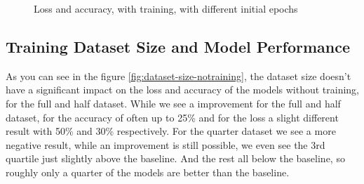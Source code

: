\begin{figure}
\begin{subfigure}{0.5\textwidth}
    \end{subfigure}
    \caption{Loss and accuracy, with training, with different initial epochs}
    \label{fig:initial-epochs-training}
\end{figure}
\subsection{Training Dataset Size and Model Performance}\label{subsec:training-dataset-size-and-model-performance}
As you can see in the figure \ref{fig:dataset-size-notraining}, the dataset size doesn't have a significant impact on the loss and accuracy of the models without training, for the full and half dataset.
While we see a improvement for the full and half dataset, for the accuracy of often up to 25\% and for the loss a slight different result with 50\% and 30\% respectively.
For the quarter dataset we see a more negative result, while an improvement is still possible, we even see the 3rd quartile just slightly above the baseline.
And the rest all below the baseline, so roughly only a quarter of the models are better than the baseline.

